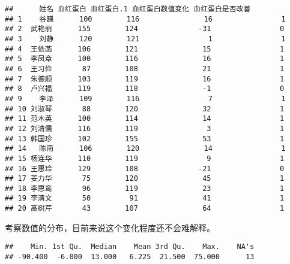 \documentclass[
]{article}
\newenvironment{Shaded}{\begin{snugshade}}{\end{snugshade}}
\newcommand{\FunctionTok}[1]{\textcolor[rgb]{0.00,0.00,0.00}{#1}}
\newcommand{\NormalTok}[1]{#1}
\newcommand{\SpecialCharTok}[1]{\textcolor[rgb]{0.00,0.00,0.00}{#1}}
\begin{document}
\begin{verbatim}
##      姓名 血红蛋白 血红蛋白.1 血红蛋白数值变化 血红蛋白是否改善
## 1    谷巍      100        116               16                1
## 2  武艳丽      155        124              -31                0
## 3    刘静      120        121                1                1
## 4  王依菡      106        121               15                1
## 5  李凤章      100        116               16                1
## 6  王习俭       87        108               21                1
## 7  朱德顺      103        119               16                1
## 8  卢兴福      119        118               -1                0
## 9    李泽      109        116                7                1
## 10 刘淑琴       88        120               32                1
## 11 范木英      100        114               14                1
## 12 刘清儒      116        119                3                1
## 13 韩国珍      102        155               53                1
## 14   陈南      106        120               14                1
## 15 杨连华      110        119                9                1
## 16 王惠玲      129        108              -21                0
## 17 姜力华       75        120               45                1
## 18 李惠鸾       96        119               23                1
## 19 李清文       50         91               41                1
## 20 高树芹       43        107               64                1
\end{verbatim}

考察数值的分布，目前来说这个变化程度还不会难解释。

\begin{Shaded}
\end{Shaded}

\begin{verbatim}
##    Min. 1st Qu.  Median    Mean 3rd Qu.    Max.    NA's 
## -90.400  -6.000  13.000   6.225  21.500  75.000      13
\end{verbatim}
\end{document}
